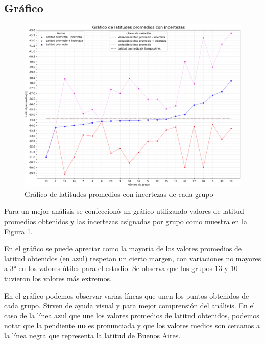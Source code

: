 \documentclass[12pt, a4paper]{article} %
\begin{document}
\subsection{Gráfico}
\begin{figure}[H]
    \centering
    \includegraphics[width=15cm]{images/gráfico_análisis.png}
    \caption{Gráfico de latitudes promedios con incertezas de cada grupo}
    \label{fig:grafico}
\end{figure}

Para un mejor análisis se confeccionó un gráfico utilizando valores de latitud promedios obtenidos y las incertezas asignadas por grupo como muestra en la Figura \ref{fig:grafico}.

En el gráfico se puede apreciar como la mayoría de los valores promedios de latitud obtenidos (en azul) respetan un cierto margen, con variaciones no mayores a $\ang{3}$ en los valores útiles para el estudio. Se observa que los grupos 13 y 10 tuvieron los valores más extremos. 

En el gráfico podemos observar varias líneas que unen los puntos obtenidos de cada grupo. Sirven de ayuda visual y para mejor comprensión del análisis. En el caso de la línea azul que une los valores promedios de latitud obtenidos, podemos notar que la pendiente \textbf{no} es pronunciada y que los valores medios son cercanos a la línea negra que representa la latitud de Buenos Aires. 
\end{document}
